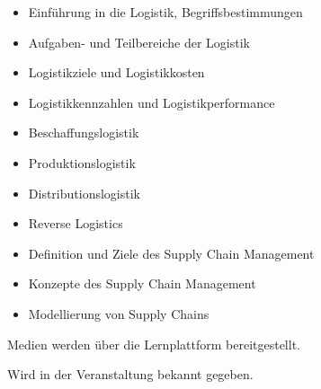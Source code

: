 \begin{course}
\begin{content}
 \begin{itemize}\item Einführung in die Logistik, Begriffsbestimmungen  \item Aufgaben- und Teilbereiche der Logistik  \item Logistikziele und Logistikkosten  \item Logistikkennzahlen und Logistikperformance  \item Beschaffungslogistik  \item Produktionslogistik  \item Distributionslogistik  \item Reverse Logistics  \item Definition und Ziele des Supply Chain Management  \item Konzepte des Supply Chain Management  \item Modellierung von Supply Chains  \end{itemize}
\end{content}

\begin{media}Medien werden über die Lernplattform bereitgestellt.

\end{media}

\begin{literature}Wird in der Veranstaltung bekannt gegeben.

\end{literature}



\end{course}